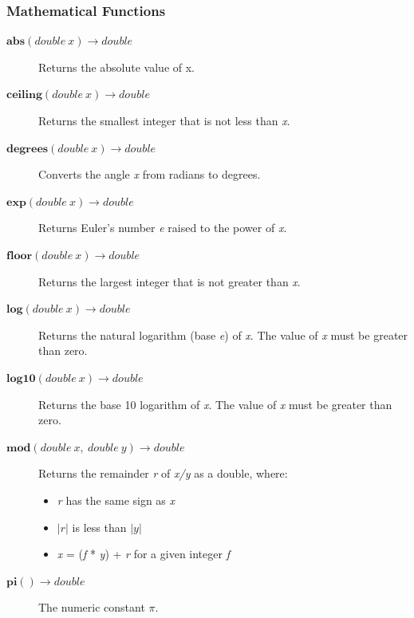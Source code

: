 \documentclass[11pt,a4paper]{ivoa}
\begin{document}
\subsubsection{Mathematical Functions}
\begin{description}
    \item[\texttt{$\textbf{abs}(double\ x) \to double$}]
    Returns the absolute value of x.
    
    \item[\texttt{$\textbf{ceiling}(double\ x) \to double$}]
    Returns the smallest integer that is not less than \textit{x}.
    
    \item[\texttt{$\textbf{degrees}(double\ x) \to double$}]
    Converts the angle \textit{x} from radians to degrees.
    
    \item[\texttt{$\textbf{exp}(double\ x) \to double$}]
    Returns Euler’s number \textit{e} raised to the power of \textit{x}.
    
    \item[\texttt{$\textbf{floor}(double\ x) \to double$}]
    Returns the largest integer that is not greater than \textit{x}.
    
    \item[\texttt{$\textbf{log}(double\ x) \to double$}]
    Returns the natural logarithm (base \textit{e}) of \textit{x}. The value of \textit{x} must be greater than zero.
    
    \item[\texttt{$\textbf{log10}(double\ x) \to double$}]
    Returns the base 10 logarithm of \textit{x}. The value of \textit{x} must be greater than zero.
    
    \item[\texttt{$\textbf{mod}(double\ x,\ double\ y) \to double$}]
    Returns the remainder \textit{r} of \textit{x/y} as a double,
    where:
    \begin{itemize}
        \item \textit{r} has the same sign as \textit{x}
            \item \textit{$|r|$} is less than \textit{$|y|$}
            \item \textit{x} = (\textit{f} * \textit{y}) + \textit{r} for a given integer \textit{f}
    \end{itemize}
    
    \item[\texttt{$\textbf{pi}() \to double$}]
    The numeric constant \(\pi\).
    

\end{description}
\end{document}
